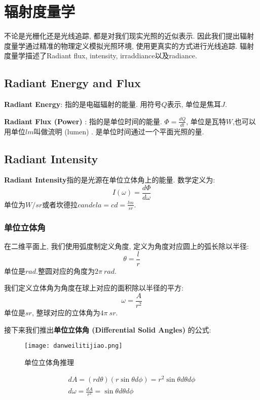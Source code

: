 \chapter{辐射度量学}
不论是光栅化还是光线追踪, 都是对我们现实光照的近似表示. 因此我们提出辐射度量学通过精准的物理定义模拟光照环境, 使用更真实的方式进行光线追踪. 辐射度量学描述了Radiant flux, intensity, irraddiance以及radiance. 

\section{Radiant Energy and Flux}
\textbf{Radiant Energy}: 指的是电磁辐射的能量. 用符号$Q$表示, 单位是焦耳$J$.

\textbf{Radiant Flux (Power) }: 指的是单位时间的能量. $\Phi=\frac{dQ}{dt}$, 单位是瓦特$W$,也可以用单位$lm$叫做流明 (lumen) . 是单位时间通过一个平面光照的量. 

\section{Radiant Intensity}
\textbf{Radiant Intensity}指的是光源在单位立体角上的能量. 数学定义为: 
\begin{equation}
	I(\omega)=\frac{d\Phi}{d\omega}
\end{equation} 单位为$W/sr$或者坎德拉$candela=cd=\frac{lm}{sr}$.

\subsection{单位立体角}
在二维平面上, 我们使用弧度制定义角度, 定义为角度对应圆上的弧长除以半径: 
\begin{equation}
	\theta = \frac{l}{r}
\end{equation} 单位是$rad$.整圆对应的角度为$2\pi\ rad$.

我们定义立体角为角度在球上对应的面积除以半径的平方: 
\begin{equation}
	\omega=\frac{A}{r^2}
\end{equation} 单位是$sr$, 整球对应的立体角为$4\pi\ sr$.

接下来我们推出\textbf{单位立体角 (Differential Solid Angles) }的公式: 
\begin{figure}[H]
	\centering
	\texttt{[image: danweilitijiao.png]}
	\caption{单位立体角推理}
	\label{fig:dwltj}
\end{figure}

\begin{equation}
\begin{split}
	dA=(rd\theta)(r\sin \theta d \phi)=r^2\sin\theta d\theta d\phi \\
	d\omega=\frac{dA}{r^2}=\sin\theta d\theta d\phi
\end{split}
\end{equation}

